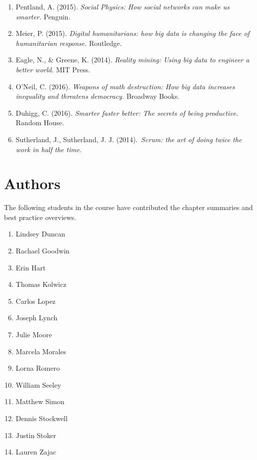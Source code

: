 \documentclass[]{book}
\providecommand{\tightlist}{%
  \setlength{\itemsep}{0pt}\setlength{\parskip}{0pt}}
\begin{document}
\begin{enumerate}
\def\labelenumi{\arabic{enumi}.}
\tightlist
\item
  Pentland, A. (2015). \emph{Social Physics: How social networks can make us smarter.} Penguin.
\item
  Meier, P. (2015). \emph{Digital humanitarians: how big data is changing the face of humanitarian response.} Routledge.\\
\item
  Eagle, N., \& Greene, K. (2014). \emph{Reality mining: Using big data to engineer a better world.} MIT Press.\\
\item
  O'Neil, C. (2016). \emph{Weapons of math destruction: How big data increases inequality and threatens democracy.} Broadway Books.
\item
  Duhigg, C. (2016). \emph{Smarter faster better: The secrets of being productive.} Random House.
\item
  Sutherland, J., Sutherland, J. J. (2014).~\emph{Scrum: the art of doing twice the work in half the time.}
\end{enumerate}

\hypertarget{authors}{%
\section{Authors}\label{authors}}

The following students in the course have contributed the chapter summaries and best practice overviews.

\begin{enumerate}
\def\labelenumi{\arabic{enumi}.}
\tightlist
\item
  Lindsey Duncan
\item
  Rachael Goodwin\\
\item
  Erin Hart\\
\item
  Thomas Kolwicz
\item
  Carlos Lopez
\item
  Joseph Lynch
\item
  Julie Moore
\item
  Marcela Morales
\item
  Lorna Romero
\item
  William Seeley
\item
  Matthew Simon
\item
  Dennis Stockwell
\item
  Justin Stoker
\item
  Lauren Zajac
\end{enumerate}
\end{document}
